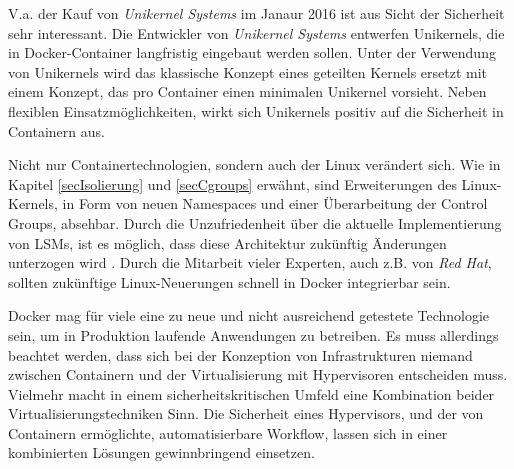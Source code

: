 \documentclass[../main.tex]{subfiles}
\begin{document}
  V.a. der Kauf von \emph{Unikernel Systems} im Janaur 2016 ist aus Sicht der Sicherheit sehr interessant. Die Entwickler von \emph{Unikernel Systems} entwerfen Unikernels, die in Docker-Container langfristig eingebaut werden sollen. Unter der Verwendung von Unikernels wird das klassische Konzept eines geteilten Kernels ersetzt mit einem Konzept, das pro Container einen minimalen Unikernel vorsieht. Neben flexiblen Einsatzmöglichkeiten, wirkt sich Unikernels positiv auf die Sicherheit in Containern aus.

  Nicht nur Containertechnologien, sondern auch der Linux verändert sich. Wie in Kapitel \ref{secIsolierung} und \ref{secCgroups} erwähnt, sind Erweiterungen des Linux-Kernels, in Form von neuen Namespaces und einer Überarbeitung der Control Groups, absehbar. Durch die Unzufriedenheit über die aktuelle Implementierung von LSMs, ist es möglich, dass diese Architektur zukünftig Änderungen unterzogen wird \cite{https://lwn.net/Articles/443099/}. Durch die Mitarbeit vieler Experten, auch z.B. von \emph{Red Hat}, sollten zukünftige Linux-Neuerungen schnell in Docker integrierbar sein.

  Docker mag für viele eine zu neue und nicht ausreichend getestete Technologie sein, um in Produktion laufende Anwendungen zu betreiben. Es muss allerdings beachtet werden, dass sich bei der Konzeption von Infrastrukturen niemand zwischen Containern und der Virtualisierung mit Hypervisoren entscheiden muss. Vielmehr macht in einem sicherheitskritischen Umfeld eine Kombination beider Virtualisierungstechniken Sinn. Die Sicherheit eines Hypervisors, und der von Containern ermöglichte, automatisierbare Workflow, lassen sich in einer kombinierten Lösungen gewinnbringend einsetzen.



\end{document}
